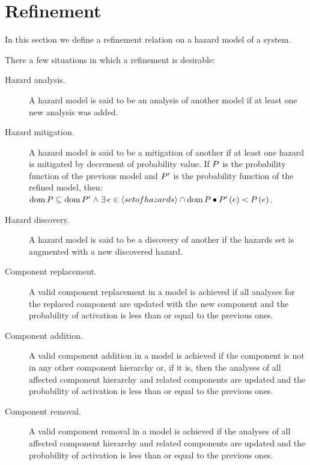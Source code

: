 \section{Refinement}

In this section we define a refinement relation on a hazard model of a system.


There a few situations in which a refinement is desirable:
\begin{description}
  \item[Hazard analysis.] A hazard model is said to be an analysis of another model if at least one new analysis was added.
  \item[Hazard mitigation.] A hazard model is said to be a mitigation of another if at least one hazard is mitigated by decrement of probability value. If $P$ is the probability function of the previous model and $P'$ is the probability function of the refined model, then: 
%
\\$\hmdom{\hmprobabilitysymbol} \subseteq \hmdom{\hmprobabilitysymbol'} \land%
\hmexists{e \in \hminter{\hmseqenum{set of hazards}}{\hmdom{\hmprobabilitysymbol}}}{%
\hmprobability[\hmprobabilitysymbol']{e} < \hmprobability{e}%
}$.
  \item[Hazard discovery.] A hazard model is said to be a discovery of another if the hazards set is augmented with a new discovered hazard.
  \item[Component replacement.] A valid component replacement in a model is achieved if all analyses for the replaced component are updated with the new component and the probability of activation is less than or equal to the previous ones.
  \item[Component addition.] A valid component addition in a model is achieved if the component is not in any other component hierarchy or, if it is, then the analyses of all affected component hierarchy and related components are updated and the probability of activation is less than or equal to the previous ones.
  \item[Component removal.] A valid component removal in a model is achieved if the analyses of all affected component hierarchy and related components are updated and the probability of activation is less than or equal to the previous ones. 
\end{description}

